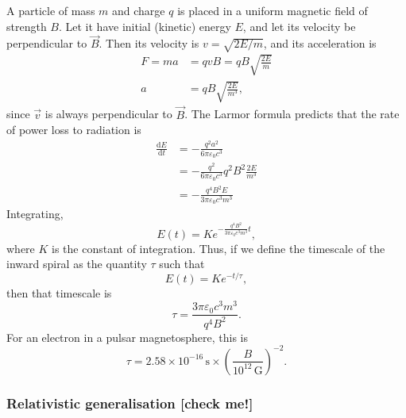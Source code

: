 \documentclass{book}
\newcommand{\deriv}[2]{\frac{\text{d}{#1}}{\text{d}{#2}}}
\begin{document}
A particle of mass $m$ and charge $q$ is placed in a uniform magnetic field of strength $B$.
Let it have initial (kinetic) energy $E$, and let its velocity be perpendicular to $\vec{B}$.
Then its velocity is $v = \sqrt{2E/m}$, and its acceleration is
\begin{equation}
\begin{aligned}
    F = ma &= qvB = qB\sqrt{\frac{2E}{m}} \\
    a &= qB\sqrt{\frac{2E}{m^3}},
\end{aligned}
\end{equation}
since $\vec{v}$ is always perpendicular to $\vec{B}$.
The Larmor formula predicts that the rate of power loss to radiation is
\begin{equation}
\begin{aligned}
    \deriv{E}{t} &= -\frac{q^2a^2}{6\pi\varepsilon_0 c^3} \\
    &= -\frac{q^2}{6\pi\varepsilon_0 c^3} q^2 B^2 \frac{2E}{m^3} \\
    &= -\frac{q^4 B^2 E}{3\pi\varepsilon_0 c^3 m^3}
\end{aligned}
\end{equation}
Integrating,
\begin{equation}
    E(t) = K e^{-\frac{q^4 B^2}{3\pi\varepsilon_0 c^3 m^3}t},
\end{equation}
where $K$ is the constant of integration. Thus, if we define the timescale of the inward spiral as the quantity $\tau$ such that
\begin{equation}
    E(t) = Ke^{-t/\tau},
\end{equation}
then that timescale is
\begin{equation}
    \tau = \frac{3\pi\varepsilon_0 c^3 m^3}{q^4 B^2}.
\end{equation}
For an electron in a pulsar magnetosphere, this is
\begin{equation}
    \tau = 2.58 \times 10^{-16}\,\text{s} \times \left(\frac{B}{10^{12}\,\text{G}}\right)^{-2}.
\end{equation}

\subsubsection{Relativistic generalisation [check me!]}
\end{document}
